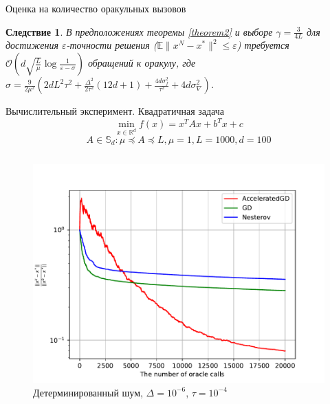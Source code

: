 \documentclass{beamer}
\newtheorem{corollary-ru}{Следствие}
\begin{document}
\begin{frame}{Оценка на количество оракульных вызовов}
 \begin{corollary-ru}
 В предположениях теоремы \ref{theorem2} и выборе $\gamma = \frac{3}{4L}$ для достижения $\varepsilon$-точности решения ($\mathbb{E} \|x^N - x^*\|^2 \leqslant \varepsilon$) требуется $\mathcal{O}\left(d \sqrt{\frac{L}{\mu}} \log \frac{1}{\varepsilon - \sigma}\right)$ обращений к оракулу, где $\sigma = \frac{9}{2\mu^2}\left(2dL^2\tau^2 + \frac{\Delta^2}{2\tau^2}(12d + 1) + \frac{4d\sigma_f^2}{\tau^2} + 4d \sigma_\nabla^2\right)$.
\end{corollary-ru}
\end{frame}




\begin{frame}{Вычислительный эксперимент. Квадратичная задача}
$$\min\limits_{x \in \mathbb{R}^d} f(x) = x^T A x + b^T x + c$$
$$A \in \mathbb{S}_d: \mu \preceq A \preceq L, \mu = 1, L = 1000, d = 100$$
\begin{columns}[c]
    \begin{figure}
    \includegraphics[width=1.0\textwidth]{Deterministic_quadratic_AGD_GD_Nesterov_18.pdf}
        \caption*{Детерминированный шум, $\Delta = 10^{-6}$, $\tau = 10^{-4}$}
    \end{figure}


\end{columns}
\end{frame}
\end{document}
